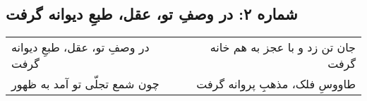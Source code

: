 \begin{center}
\section*{شماره ۲: در وصفِ تو، عقل، طبعِ دیوانه گرفت}
\label{sec:002}
\begin{longtable}{l p{0.5cm} r}
در وصفِ تو، عقل، طبعِ دیوانه گرفت
&&
جان تن زد و با عجز به هم خانه گرفت
\\
چون شمع تجلّی تو آمد به ظهور
&&
طاووسِ فلک، مذهبِ پروانه گرفت
\\
\end{longtable}
\end{center}
